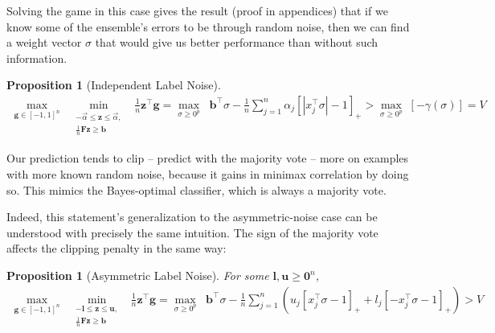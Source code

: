 \documentclass{colt2015} %
\newtheorem{prop}[thm]{Proposition}
\newcommand{\vF}{\mathbf{F}}
\newcommand{\vb}{\mathbf{b}}
\newcommand{\vu}{\mathbf{u}}
\newcommand{\vl}{\mathbf{l}}
\newcommand{\vg}{\mathbf{g}}
\newcommand{\vz}{\mathbf{z}}
\newcommand{\valpha}{\vec{\alpha}}
\newcommand{\vzero}{\mathbf{0}}
\newcommand{\abs}[1]{\left| #1 \right|}
\newcommand{\lrp}[1]{\left(#1\right)}
\newcommand{\authcmt}[2]{\textcolor{#1}{}}
\newcommand{\akshay}[1]{\authcmt{red}{[AB: #1]}}
\begin{document}
Solving the game in this case gives the result (proof in appendices) 
that if we know some of the ensemble's errors to be through random noise, 
then we can find a weight vector $\sigma$ that would give us better performance than 
without such information. 
\begin{prop}[Independent Label Noise]
\label{prop:labnoise}
\begin{align*}
\max_{\vg \in [-1,1]^n} \;\;\min_{\substack{ - \valpha \leq \vz \leq \valpha , \\ 
\frac{1}{n} \vF \vz \geq \vb }} \;\; \frac{1}{n} \vz{^\top} \vg 
= \max_{\sigma \geq 0^p } \;\;\vb^\top \sigma - \frac{1}{n} \sum_{j=1}^n \alpha_j \left[ \abs{x_{j}^\top \sigma} - 1 \right]_{+}
> \max_{\sigma \geq 0^p } \;[- \gamma (\sigma)]
= V 
\end{align*}
\end{prop}
Our prediction tends to clip -- predict with the majority vote -- more on examples with more known random noise, 
because it gains in minimax correlation by doing so. 
This mimics the Bayes-optimal classifier, which is always a majority vote. 

Indeed, this statement's generalization to the asymmetric-noise case 
can be understood with precisely the same intuition. 
The sign of the majority vote affects the clipping penalty in the same way:
\begin{prop}[Asymmetric Label Noise] 
For some $\vl, \vu \geq \vzero^n$,
\begin{align*}
\max_{\vg \in [-1,1]^n} \;\;\min_{\substack{ -\vl \leq \vz \leq \vu , \\ 
\frac{1}{n} \vF \vz \geq \vb }} \;\; \frac{1}{n} \vz{^\top} \vg 
= \max_{\sigma \geq 0^p } \;\;\vb^\top \sigma - \frac{1}{n} \sum_{j=1}^n \lrp{ u_j \left[ x_{j}^\top \sigma - 1 \right]_{+} + l_j \left[ - x_{j}^\top \sigma - 1 \right]_{+} }
> V 
\end{align*}
\end{prop}







\iffalse
\akshay{If there's space: Point out that feasibility conditions make this a statement about 
\emph{where we know the errors are coming from}, countering the naive objection that ``adding noise should not ever increase performance." }
\end{document}
